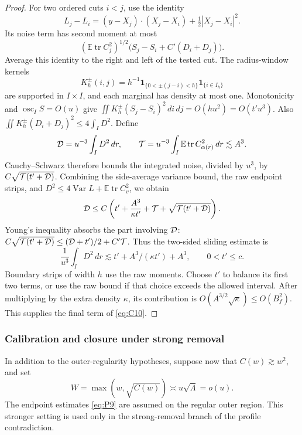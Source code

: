 \begin{proof}
For two ordered cuts \(i<j\), use the identity
\[
 L_j-L_i=(y-X_j)\cdot(X_j-X_i)+\tfrac12|X_j-X_i|^2.
\]
Its noise term has second moment at most
\[
 (\mathbb E\operatorname{tr}C_j^2)^{1/2}
 \bigl(S_j-S_i+C'(D_i+D_j)\bigr).
\]
Average this identity to the right and left of the tested cut.
The radius-window kernels
\[
 K_h^\pm(i,j)=h^{-1}\mathbf1_{\{0<\pm(j-i)<h\}}
                       \mathbf1_{\{i\in I_h\}}
\]
are supported in \(I\times I\), and each marginal has density at most
one. Monotonicity and \(\operatorname{osc}_I S=O(u)\) give
\(\iint K_h^\pm(S_j-S_i)^2\,di\,dj=O(hu^2)=O(t'u^3)\).
Also \(\iint K_h^\pm(D_i+D_j)^2\le4\int_I D^2\).
Define
\[
 {\cal D}=u^{-3}\int_I D^2\,dr,\qquad
 {\cal T}=u^{-3}\int_I\mathbb E\operatorname{tr}C_{\alpha(r)}^2\,dr
       \lesssim A^3.
\]
Cauchy--Schwarz therefore bounds the integrated noise, divided by
\(u^3\), by \(C\sqrt{{\cal T}(t'+{\cal D})}\).
Combining the side-average variance bound, the raw endpoint strips,
and \(D^2\le4\operatorname{Var}L+\mathbb E\operatorname{tr}C_v^2\),
we obtain
\[
 {\cal D}\le C\left(t'+\frac{A^3}{\kappa t'}+{\cal T}
                    +\sqrt{{\cal T}(t'+{\cal D})}\right).
\]
Young's inequality absorbs the part involving \({\cal D}\):
\(C\sqrt{{\cal T}(t'+{\cal D})}
\le({\cal D}+t')/2+C'{\cal T}\).
Thus the two-sided sliding estimate is
\[
 \frac1{u^3}\int_I D^2\,dr
       \lesssim t'+A^3/(\kappa t')+A^3,\qquad 0<t'\le c.
\]
Boundary strips of width \(h\) use the raw moments. Choose \(t'\)
to balance its first two terms, or use the raw bound if that choice
exceeds the allowed interval. After multiplying by the extra density
\(\kappa\), its contribution is
\(O(A^{3/2}\sqrt\kappa)\le O(B_f^2)\). This supplies the final
term of \eqref{eq:C10}.



\end{proof}

\subsubsection{Calibration and closure under strong removal}

In addition to the outer-regularity hypotheses, suppose now that
$C(w)\gtrsim w^2$, and set
\[
 W=\max(w,\sqrt{C(w)})\asymp u\sqrt\Lambda=o(u).
\]
The endpoint estimates \eqref{eq:P9} are assumed on the regular outer
region. This stronger setting is used only in the strong-removal branch
of the profile contradiction.

